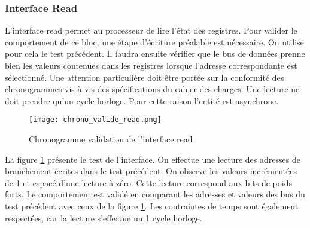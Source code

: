 \subsubsection{Interface Read}
L'interface read permet au processeur de lire l'état des registres.
Pour valider le comportement de ce bloc, une étape d'écriture préalable est nécessaire.
On utilise pour cela le test précédent.
Il faudra ensuite vérifier que le bus de données prenne bien les valeurs contenues dans les registres lorsque l'adresse correspondante est sélectionné.
Une attention particulière doit être portée sur la conformité des chronogrammes vis-à-vis des spécifications du cahier des charges.
Une lecture ne doit prendre qu'un cycle horloge.
Pour cette raison l'entité est asynchrone.
\begin{figure}[H]
	\centering
	\texttt{[image: chrono\_valide\_read.png]}
	\caption{Chronogramme validation de l'interface read}
	\label{fig:chrono_interface_read}
\end{figure}
La figure \ref{fig:chrono_interface_read} présente le test de l'interface.
On effectue une lecture des adresses de branchement écrites dans le test précédent.
On observe les valeurs incrémentées de 1 et espacé d'une lecture à zéro.
Cette lecture correspond aux bits de poids forts.
Le comportement est validé en comparant les adresses et valeurs des bus du test précédent avec ceux de la figure \ref{fig:chrono_interface_read}.
Les contraintes de temps sont également respectées, car la lecture s'effectue un 1 cycle horloge.

